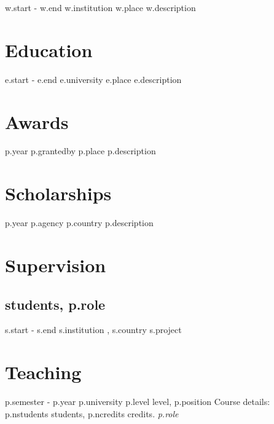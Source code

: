 \documentclass[10pt,letterpaper]{article} %
\begin{document}
{%
    { {{ w.start }} -   {{ w.end }}  }
    { {{ w.institution }}  }
    { {{ w.place }}  }
    { {{ w.description }}}
{%

\section*{Education} %

{%
    { {{ e.start }} - {{ e.end }} }
    { {{ e.university }} }
    { {{ e.place }} }
    { {{ e.description }} }
{%


\section*{Awards}

{%
    { {{ p.year }} }
    { {{ p.grantedby }} }
    { {{p.place}} }
    { {{ p.description }} }
{%

\section*{Scholarships}

{%
    { {{ p.year }} }
    { {{ p.agency }} }
    { {{ p.country }} }
    { {{ p.description }} }
{%

\section*{Supervision}

{%
\subsection*{ students, {{ p.role }}  }
    {%
        { {{ s.start }} - {{s.end}} }
        {  }
        { {{ s.institution }}, {{ s.country }} }
        { { {{ s.project }} } }
        {%
{%


\section*{Teaching}

{%
    {   {{ p.semester }} - {{ p.year }}  }
    { {{ p.university }} }
    { {{ p.level }} level, {{ p.position }} }
    { Course details: {{ p.nstudents }} students, {{ p.ncredits }} credits.  \emph{ {{p.role}} } }
    {%




}}}}}}}}}}}}}}
\end{document}
